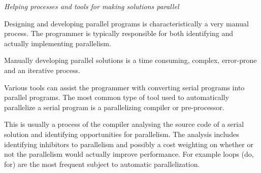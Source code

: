 \emph{Helping processes and tools for making solutions parallel}

Designing and developing parallel programs is characteristically a very manual process. The programmer is typically responsible for both identifying and actually implementing parallelism.

Manually developing parallel solutions is a time consuming, complex, error-prone and an iterative process.

Various tools can assist the programmer with converting serial programs into parallel programs. The most common type of tool used to automatically parallelize a serial program is a parallelizing compiler or pre-processor.

This is usually a process of the compiler analysing the source code of a serial solution and identifying opportunities for parallelism. The analysis includes identifying inhibitors to parallelism and possibly a cost weighting on whether or not the parallelism would actually improve performance. For example loops (do, for) are the most frequent subject to automatic parallelization.

